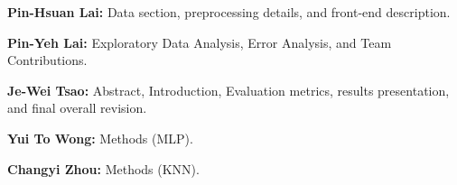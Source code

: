 \textbf{Pin-Hsuan Lai:} Data section, preprocessing details, and front-end description.

\textbf{Pin-Yeh Lai:} Exploratory Data Analysis, Error Analysis, and Team Contributions.

\textbf{Je-Wei Tsao:} Abstract, Introduction, Evaluation metrics, results presentation, and final overall revision.

\textbf{Yui To Wong:} Methods (MLP).

\textbf{Changyi Zhou:} Methods (KNN).


%
%
%
%
